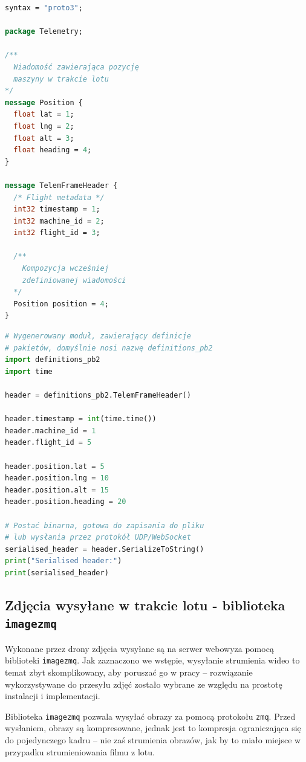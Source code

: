 \begin{lstlisting}[language=protobuf, label=list:protobuf,caption=Przykład definicji pakietu \texttt{protobuf}, basicstyle=\footnotesize\ttfamily]
syntax = "proto3";

package Telemetry;

/**
  Wiadomość zawierająca pozycję
  maszyny w trakcie lotu
*/
message Position {
  float lat = 1;
  float lng = 2;
  float alt = 3;
  float heading = 4;
}

message TelemFrameHeader {
  /* Flight metadata */
  int32 timestamp = 1;
  int32 machine_id = 2;
  int32 flight_id = 3;

  /**
	Kompozycja wcześniej
	zdefiniowanej wiadomości 
  */
  Position position = 4;
}
\end{lstlisting}

\begin{lstlisting}[language=Python, label=list:protobuf,caption=Przykład wykorzystania wygenerowanej implementacji pakietów w języku Python,basicstyle=\footnotesize\ttfamily]
# Wygenerowany moduł, zawierający definicje
# pakietów, domyślnie nosi nazwę definitions_pb2
import definitions_pb2
import time

header = definitions_pb2.TelemFrameHeader()

header.timestamp = int(time.time())
header.machine_id = 1
header.flight_id = 5

header.position.lat = 5
header.position.lng = 10
header.position.alt = 15
header.position.heading = 20

# Postać binarna, gotowa do zapisania do pliku
# lub wysłania przez protokół UDP/WebSocket
serialised_header = header.SerializeToString()
print("Serialised header:")
print(serialised_header) 
\end{lstlisting}

\subsection{Zdjęcia wysyłane w trakcie lotu - biblioteka \texttt{imagezmq}}

Wykonane przez drony zdjęcia wysyłane są na serwer webowyza pomocą biblioteki
\texttt{imagezmq}. Jak zaznaczono we wstępie, wysyłanie strumienia wideo to
temat zbyt skomplikowany, aby poruszać go w pracy -- rozwiązanie wykorzystywane
do przesyłu zdjęć zostało wybrane ze względu na prostotę instalacji i implementacji.

Biblioteka \texttt{imagezmq} pozwala wysyłać obrazy za pomocą protokołu \texttt{zmq}.
Przed wysłaniem, obrazy są kompresowane, jednak jest to kompresja ograniczająca się do 
pojedynczego kadru -- nie zaś strumienia obrazów, jak by to miało miejsce w przypadku 
strumieniowania filmu z lotu.

